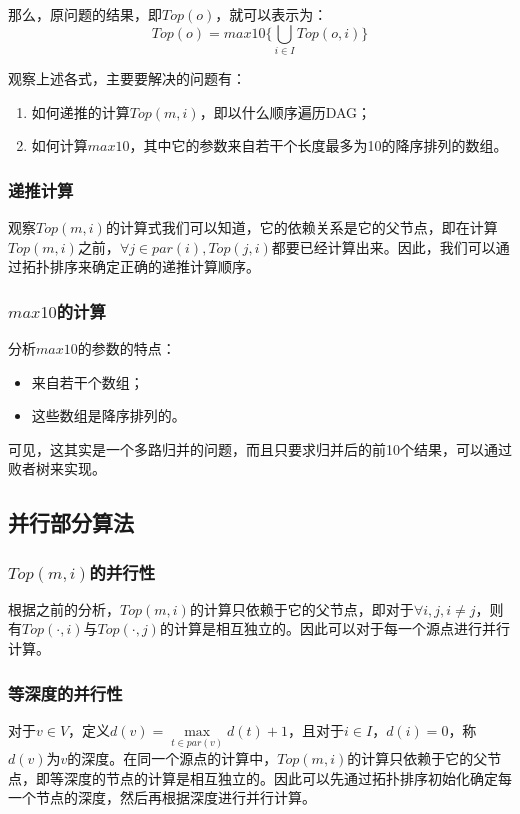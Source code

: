 \documentclass{article}
\begin{document}
	那么，原问题的结果，即$Top(o)$，就可以表示为：
	$$Top(o)=max10\{\bigcup\limits_{i\in I}Top(o,i)\}$$
	
	观察上述各式，主要要解决的问题有：
	\begin{enumerate}
		\item 如何递推的计算$Top(m,i)$，即以什么顺序遍历DAG；
		\item 如何计算$max10$，其中它的参数来自若干个长度最多为10的降序排列的数组。
	\end{enumerate}
	
	\subsubsection{递推计算}
	观察$Top(m,i)$的计算式我们可以知道，它的依赖关系是它的父节点，即在计算$Top(m,i)$之前，$\forall j\in par(i), Top(j,i)$都要已经计算出来。因此，我们可以通过拓扑排序来确定正确的递推计算顺序。
	
	\subsubsection{$max10$的计算}
	分析$max10$的参数的特点：
	\begin{itemize}
		\item 来自若干个数组；
		\item 这些数组是降序排列的。
	\end{itemize}
	可见，这其实是一个多路归并的问题，而且只要求归并后的前10个结果，可以通过败者树来实现。
	
	\subsection{并行部分算法}
	\subsubsection{$Top(m,i)$的并行性}
	根据之前的分析，$Top(m,i)$的计算只依赖于它的父节点，即对于$\forall i,j,i\neq j$，则有$Top(\cdot,i)$与$Top(\cdot,j)$的计算是相互独立的。因此可以对于每一个源点进行并行计算。
	
	\subsubsection{等深度的并行性}
	对于$v\in V$，定义$d(v)=\max\limits_{t\in par(v)}d(t)+1$，且对于$i\in I$，$d(i)=0$，称$d(v)$为$v$的深度。在同一个源点的计算中，$Top(m,i)$的计算只依赖于它的父节点，即等深度的节点的计算是相互独立的。因此可以先通过拓扑排序初始化确定每一个节点的深度，然后再根据深度进行并行计算。
	
\end{document}
